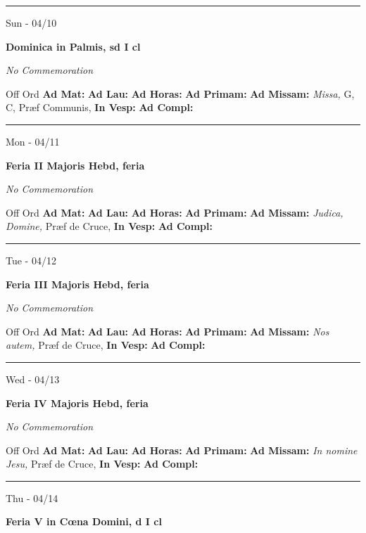 \documentclass[letterpaper, 10pt]{article}
\begin{document}
\hrule
\begin{center}
Sun - 04/10
\end{center}\textbf{ \large Dominica in Palmis, \textnormal{\normalsize sd I cl}}

\textit{No Commemoration}\begin{justify}
Off Ord
\textbf{Ad Mat: }
\textbf{Ad Lau: }
\textbf{Ad Horas: }
\textbf{Ad Primam: }
\textbf{Ad Missam:} \textit{Missa, } G, C, Præf Communis, 
\textbf{In Vesp: }
\textbf{Ad Compl: }\end{justify}



\hrule
\begin{center}
Mon - 04/11
\end{center}\textbf{ \large Feria II Majoris Hebd, \textnormal{\normalsize feria}}

\textit{No Commemoration}\begin{justify}
Off Ord
\textbf{Ad Mat: }
\textbf{Ad Lau: }
\textbf{Ad Horas: }
\textbf{Ad Primam: }
\textbf{Ad Missam:} \textit{Judica, Domine, } Præf de Cruce, 
\textbf{In Vesp: }
\textbf{Ad Compl: }\end{justify}



\hrule
\begin{center}
Tue - 04/12
\end{center}\textbf{ \large Feria III Majoris Hebd, \textnormal{\normalsize feria}}

\textit{No Commemoration}\begin{justify}
Off Ord
\textbf{Ad Mat: }
\textbf{Ad Lau: }
\textbf{Ad Horas: }
\textbf{Ad Primam: }
\textbf{Ad Missam:} \textit{Nos autem, } Præf de Cruce, 
\textbf{In Vesp: }
\textbf{Ad Compl: }\end{justify}



\hrule
\begin{center}
Wed - 04/13
\end{center}\textbf{ \large Feria IV Majoris Hebd, \textnormal{\normalsize feria}}

\textit{No Commemoration}\begin{justify}
Off Ord
\textbf{Ad Mat: }
\textbf{Ad Lau: }
\textbf{Ad Horas: }
\textbf{Ad Primam: }
\textbf{Ad Missam:} \textit{In nomine Jesu, } Præf de Cruce, 
\textbf{In Vesp: }
\textbf{Ad Compl: }\end{justify}



\hrule
\begin{center}
Thu - 04/14
\end{center}\textbf{ \large Feria V in Cœna Domini, \textnormal{\normalsize d I cl}}
\end{document}
